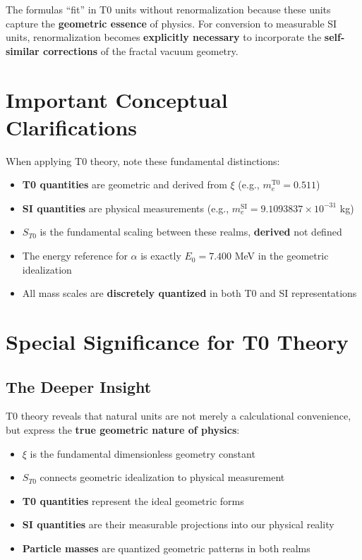 \documentclass[12pt,a4paper]{article}
\begin{document}
	The formulas ``fit'' in T0 units without renormalization because these units capture the \textbf{geometric essence} of physics. For conversion to measurable SI units, renormalization becomes \textbf{explicitly necessary} to incorporate the \textbf{self-similar corrections} of the fractal vacuum geometry.
	
	\section{Important Conceptual Clarifications}
	
	When applying T0 theory, note these fundamental distinctions:
	
	\begin{itemize}
		\item \textbf{T0 quantities} are geometric and derived from $\xi$ (e.g., $m_e^{\mathrm{T0}} = 0.511$)
		\item \textbf{SI quantities} are physical measurements (e.g., $m_e^{\mathrm{SI}} = 9.1093837\times 10^{-31}$ kg)
		\item \textbf{$S_{T0}$} is the fundamental scaling between these realms, \textbf{derived} not defined
		\item The energy reference for $\alpha$ is exactly $E_0 = 7.400$ MeV in the geometric idealization
		\item All mass scales are \textbf{discretely quantized} in both T0 and SI representations
	\end{itemize}
	
	\section{Special Significance for T0 Theory}
	
	\subsection{The Deeper Insight}
	T0 theory reveals that natural units are not merely a calculational convenience, but express the \textbf{true geometric nature of physics}:
	\begin{itemize}
		\item \textbf{$\xi$} is the fundamental dimensionless geometry constant
		\item \textbf{$S_{T0}$} connects geometric idealization to physical measurement
		\item \textbf{T0 quantities} represent the ideal geometric forms
		\item \textbf{SI quantities} are their measurable projections into our physical reality
		\item \textbf{Particle masses} are quantized geometric patterns in both realms
	\end{itemize}
	
\end{document}
